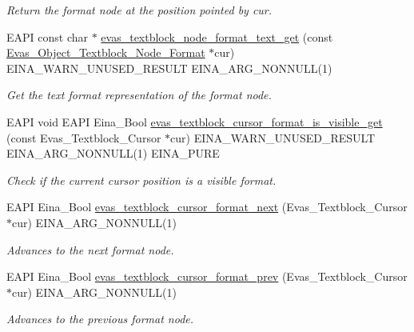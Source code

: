 \begin{DoxyCompactItemize}
\begin{DoxyCompactList}\small\item\em Return the format node at the position pointed by cur. \item\end{DoxyCompactList}\item 
EAPI const char $\ast$ \hyperlink{group__Evas__Object__Textblock_gae386e3627175b7d20a14ad58ddd5aaa8}{evas\_\-textblock\_\-node\_\-format\_\-text\_\-get} (const \hyperlink{Evas_8h_adcd2409468741c89d607f06e17da1f64}{Evas\_\-Object\_\-Textblock\_\-Node\_\-Format} $\ast$cur) EINA\_\-WARN\_\-UNUSED\_\-RESULT EINA\_\-ARG\_\-NONNULL(1)
\begin{DoxyCompactList}\small\item\em Get the text format representation of the format node. \item\end{DoxyCompactList}\item 
EAPI void EAPI Eina\_\-Bool \hyperlink{group__Evas__Object__Textblock_ga8a85968d8fe24bcb92738df510993d8c}{evas\_\-textblock\_\-cursor\_\-format\_\-is\_\-visible\_\-get} (const Evas\_\-Textblock\_\-Cursor $\ast$cur) EINA\_\-WARN\_\-UNUSED\_\-RESULT EINA\_\-ARG\_\-NONNULL(1) EINA\_\-PURE
\begin{DoxyCompactList}\small\item\em Check if the current cursor position is a visible format. \item\end{DoxyCompactList}\item 
EAPI Eina\_\-Bool \hyperlink{group__Evas__Object__Textblock_gaedae64aa95805f0c3480cf6001297ae9}{evas\_\-textblock\_\-cursor\_\-format\_\-next} (Evas\_\-Textblock\_\-Cursor $\ast$cur) EINA\_\-ARG\_\-NONNULL(1)
\begin{DoxyCompactList}\small\item\em Advances to the next format node. \item\end{DoxyCompactList}\item 
EAPI Eina\_\-Bool \hyperlink{group__Evas__Object__Textblock_ga560593895b7ba6e3d309463c921ad9ec}{evas\_\-textblock\_\-cursor\_\-format\_\-prev} (Evas\_\-Textblock\_\-Cursor $\ast$cur) EINA\_\-ARG\_\-NONNULL(1)
\begin{DoxyCompactList}\small\item\em Advances to the previous format node. \item\end{DoxyCompactList}\item 

\end{DoxyCompactItemize}
